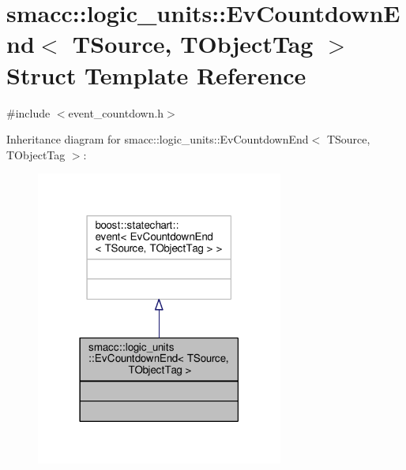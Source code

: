 \hypertarget{structsmacc_1_1logic__units_1_1EvCountdownEnd}{}\section{smacc\+:\+:logic\+\_\+units\+:\+:Ev\+Countdown\+End$<$ T\+Source, T\+Object\+Tag $>$ Struct Template Reference}
\label{structsmacc_1_1logic__units_1_1EvCountdownEnd}


{\ttfamily \#include $<$event\+\_\+countdown.\+h$>$}



Inheritance diagram for smacc\+:\+:logic\+\_\+units\+:\+:Ev\+Countdown\+End$<$ T\+Source, T\+Object\+Tag $>$\+:\nopagebreak
\begin{figure}[H]
\begin{center}
\leavevmode
\includegraphics[width=230pt]{structsmacc_1_1logic__units_1_1EvCountdownEnd__inherit__graph}
\end{center}
\end{figure}


